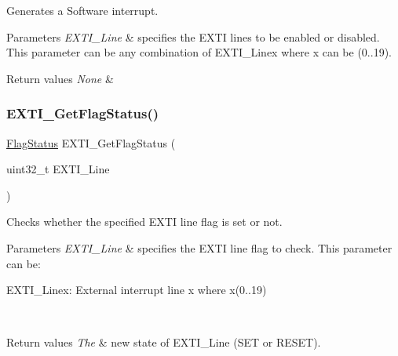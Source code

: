 Generates a Software interrupt. 


\begin{DoxyParams}{Parameters}
{\em E\+X\+T\+I\+\_\+\+Line} & specifies the E\+X\+TI lines to be enabled or disabled. This parameter can be any combination of E\+X\+T\+I\+\_\+\+Linex where x can be (0..19). \\
\hline
\end{DoxyParams}

\begin{DoxyRetVals}{Return values}
{\em None} & \\
\hline
\end{DoxyRetVals}
\mbox{\label{group___e_x_t_i___exported___functions_ga0ce06e6b312592df149800d63218cffa}} 
\subsubsection{\texorpdfstring{EXTI\_GetFlagStatus()}{EXTI\_GetFlagStatus()}}
{\footnotesize\ttfamily \mbox{\hyperlink{group___exported__types_ga89136caac2e14c55151f527ac02daaff}{Flag\+Status}} E\+X\+T\+I\+\_\+\+Get\+Flag\+Status (\begin{DoxyParamCaption}\item[{uint32\+\_\+t}]{E\+X\+T\+I\+\_\+\+Line }\end{DoxyParamCaption})}



Checks whether the specified E\+X\+TI line flag is set or not. 


\begin{DoxyParams}{Parameters}
{\em E\+X\+T\+I\+\_\+\+Line} & specifies the E\+X\+TI line flag to check. This parameter can be\+: \begin{DoxyItemize}
\item E\+X\+T\+I\+\_\+\+Linex\+: External interrupt line x where x(0..19) \end{DoxyItemize}
\\
\hline
\end{DoxyParams}

\begin{DoxyRetVals}{Return values}
{\em The} & new state of E\+X\+T\+I\+\_\+\+Line (S\+ET or R\+E\+S\+ET). \\
\hline
\end{DoxyRetVals}
\mbox{\label{group___e_x_t_i___exported___functions_gaf7b51519062ae42fd27ee689cab364aa}} 
